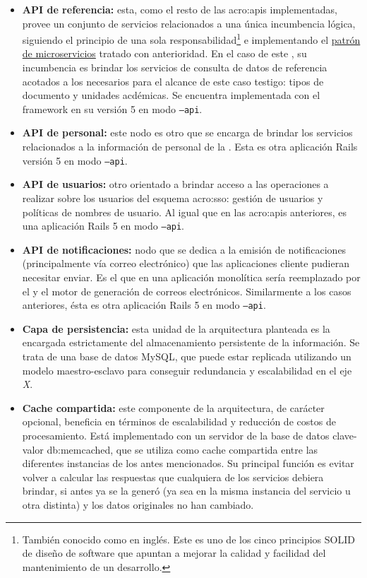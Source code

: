 \begin{itemize}
  \item \textbf{API de referencia:} esta, como el resto de las \glspl{acro:api} implementadas, provee un conjunto de servicios relacionados a una única incumbencia lógica, siguiendo el principio de una sola responsabilidad\footnote{También conocido como  en inglés. Este es uno de los cinco principios SOLID de diseño de software que apuntan a mejorar la calidad y facilidad del mantenimiento de un desarrollo.} e implementando el \hyperref[microservicios]{patrón de microservicios} tratado con anterioridad. En el caso de este , su incumbencia es brindar los servicios de consulta de datos de referencia acotados a los necesarios para el alcance de este caso testigo: tipos de documento y unidades acdémicas. Se encuentra implementada con el framework  en su versión 5 en modo \texttt{--api}.

  \item \textbf{API de personal:} este nodo es otro  que se encarga de brindar los servicios relacionados a la información de personal de la {\unlp}. Esta es otra aplicación Rails versión 5 en modo \texttt{--api}.

  \item \textbf{API de usuarios:} otro  orientado a brindar acceso a las operaciones a realizar sobre los usuarios del esquema \gls{acro:sso}: gestión de usuarios y políticas de nombres de usuario. Al igual que en las \glspl{acro:api} anteriores, es una aplicación Rails 5 en modo \texttt{--api}.

  \item \textbf{API de notificaciones:} nodo que se dedica a la emisión de notificaciones (principalmente vía correo electrónico) que las aplicaciones cliente pudieran necesitar enviar. Es el  que en una aplicación monolítica sería reemplazado por el  y el motor de generación de correos electrónicos. Similarmente a los casos anteriores, ésta es otra aplicación Rails 5 en modo \texttt{--api}.

  \item \textbf{Capa de persistencia:} esta unidad de la arquitectura planteada es la encargada estrictamente del almacenamiento persistente de la información. Se trata de una base de datos MySQL, que puede estar replicada utilizando un modelo maestro-esclavo para conseguir redundancia y escalabilidad en el eje \textit{X}.

  \item \textbf{Cache compartida:} este componente de la arquitectura, de carácter opcional, beneficia en términos de escalabilidad y reducción de costos de procesamiento. Está implementado con un servidor de la base de datos clave-valor \gls{db:memcached}, que se utiliza como cache compartida entre las diferentes instancias de los  antes mencionados. Su principal función es evitar volver a calcular las respuestas que cualquiera de los servicios debiera brindar, si antes ya se la generó (ya sea en la misma instancia del servicio u otra distinta) y los datos originales no han cambiado.
\end{itemize}

